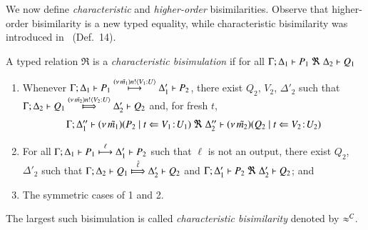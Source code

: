 {
We now define \emph{characteristic} and \emph{higher-order} bisimilarities.
Observe that higher-order bisimilarity is a new typed equality, 
while 
characteristic bisimilarity was introduced in~\cite{characteristic_bis} (Def.~14).

\begin{definition}%
	\label{d:fwb}
	A typed relation $\Re$ is a {\em  characteristic bisimulation} if 
	for all $\horel{\Gamma}{\Delta_1}{P_1}{\ \Re \ }{\Delta_2}{Q_1}$ 
	\begin{enumerate}[1)]
		\item 
				Whenever 
				$\Gamma; \Delta_1 \vdash P_1 \stackrel{(\nu\, \tilde{m_1}) n ! \langle V_1: U \rangle}{\longmapsto} \Delta_1' \vdash P_2$,
				there exist 
				$Q_2$, $V_2$, $\Delta'_2$
				such that \\
				$\horel{\Gamma}{\Delta_2}{Q_1}{\Hby{\news{\tilde{m_2}} \bactout{n}{V_2: U}}}{\Delta_2'}{Q_2}$ and, for fresh $t$, 
%
				\[
					\begin{array}{lrlll}
						\Gamma; \Delta''_1  \vdash  {(\nu\, \tilde{m_1})(P_2 \;|\;t \Leftarrow V_1 \! : \! U_1)}
						\ \Re \
						\Delta''_2 \vdash {(\nu\, \tilde{m_2})(Q_2 \;|\;t \Leftarrow V_2 \! : \! U_2)}
					\end{array}
				\]

		\item	
				For all $\Gamma; \Delta_1 \vdash P_1 \stackrel{\ell}{\longmapsto} \Delta_1' \vdash P_2$ such that 
				$\ell$ is not an output, 
				there exist $Q_2$, $\Delta'_2$ such that 
				$\horel{\Gamma}{\Delta_2}{Q_1}{\Hby{\hat{\ell}}}{\Delta_2'}{Q_2}$
				and
				$\horel{\Gamma}{\Delta_1'}{P_2}{\ \Re \ }{\Delta_2'}{Q_2}$; and 

		\item	The symmetric cases of 1 and 2.                
	\end{enumerate}
	The largest such bisimulation
	is called \emph{characteristic bisimilarity}  denoted by $\approx^C$.
\end{definition}
 


}
